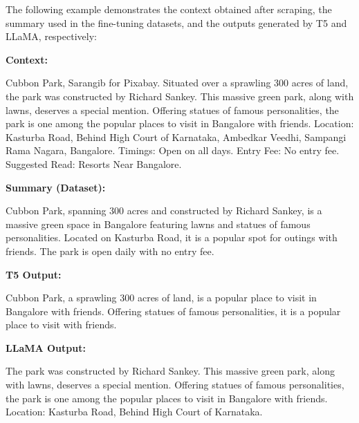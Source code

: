 \documentclass[final,1p,times]{elsarticle}
\begin{document}
        The following example demonstrates the context obtained after scraping, the summary used in the fine-tuning datasets, and the outputs generated by T5 and LLaMA, respectively:
    
    \begin{tcolorbox}[boxrule=1pt, left=15pt, right=15pt, top=0pt, bottom=0pt]
    
    \textbf{Context:}
    
    Cubbon Park, Sarangib for Pixabay. Situated over a sprawling 300 acres of land, the park was constructed by Richard Sankey. This massive green park, along with lawns, deserves a special mention. Offering statues of famous personalities, the park is one among the popular places to visit in Bangalore with friends. Location: Kasturba Road, Behind High Court of Karnataka, Ambedkar Veedhi, Sampangi Rama Nagara, Bangalore. Timings: Open on all days. Entry Fee: No entry fee. Suggested Read: Resorts Near Bangalore.
    \end{tcolorbox}
    \begin{tcolorbox}[boxrule=1pt, left=15pt, right=15pt, top=0pt, bottom=0pt]
    
    \textbf{Summary (Dataset):}
    
    Cubbon Park, spanning 300 acres and constructed by Richard Sankey, is a massive green space in Bangalore featuring lawns and statues of famous personalities. Located on Kasturba Road, it is a popular spot for outings with friends. The park is open daily with no entry fee.
    \end{tcolorbox}
    \begin{tcolorbox}[boxrule=1pt, left=15pt, right=15pt, top=0pt, bottom=0pt]
    
    \textbf{T5 Output:}
    
    Cubbon Park, a sprawling 300 acres of land, is a popular place to visit in Bangalore with friends. Offering statues of famous personalities, it is a popular place to visit with friends.
    \end{tcolorbox}
    \begin{tcolorbox}[boxrule=1pt, left=15pt, right=15pt, top=0pt, bottom=0pt]
    
    \textbf{LLaMA Output:}
    
    The park was constructed by Richard Sankey. This massive green park, along with lawns, deserves a special mention. Offering statues of famous personalities, the park is one among the popular places to visit in Bangalore with friends. Location: Kasturba Road, Behind High Court of Karnataka.
    \end{tcolorbox}
    
\end{document}
